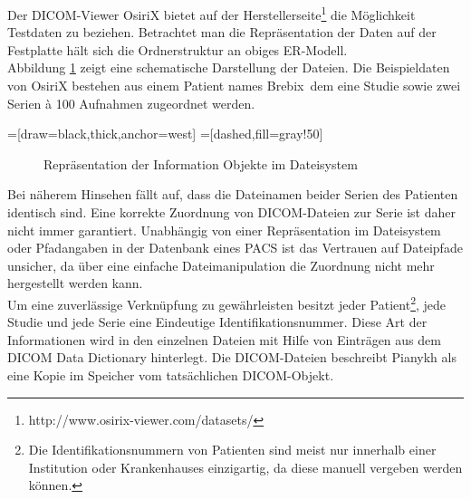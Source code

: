 Der DICOM-Viewer OsiriX bietet auf der Herstellerseite\footnote{http://www.osirix-viewer.com/datasets/} die Möglichkeit Testdaten zu beziehen. Betrachtet man die Repräsentation der Daten auf der Festplatte hält sich die Ordnerstruktur an obiges ER-Modell.\\
Abbildung \ref{filesystemrep} zeigt eine schematische Darstellung der Dateien. Die Beispieldaten von OsiriX bestehen aus einem Patient names \glqq Brebix\grqq\, dem eine Studie sowie zwei Serien à 100 Aufnahmen zugeordnet werden.

=[draw=black,thick,anchor=west]
=[dashed,fill=gray!50]
\begin{figure}[htbp]
\centering
\caption{Repräsentation der Information Objekte im Dateisystem}
\label{filesystemrep}
\end{figure}

Bei näherem Hinsehen fällt auf, dass die Dateinamen beider Serien des Patienten identisch sind. Eine korrekte Zuordnung von DICOM-Dateien zur Serie ist daher nicht immer garantiert. Unabhängig von einer Repräsentation im Dateisystem oder Pfadangaben in der Datenbank eines PACS ist das Vertrauen auf Dateipfade unsicher, da über eine einfache Dateimanipulation die Zuordnung nicht mehr hergestellt werden kann.\\
Um eine zuverlässige Verknüpfung zu gewährleisten besitzt jeder Patient\footnote{Die Identifikationsnummern von Patienten sind meist nur innerhalb einer Institution oder Krankenhauses einzigartig, da diese manuell vergeben werden können\cite[5.6.2]{pianykh:dicom}.}, jede Studie und jede Serie eine Eindeutige Identifikationsnummer. Diese Art der Informationen wird in den einzelnen Dateien mit Hilfe von Einträgen aus dem DICOM Data Dictionary\cite{dicom:dd} hinterlegt. Die DICOM-Dateien beschreibt Pianykh \cite[S. 47]{pianykh:dicom}
als eine Kopie im Speicher vom tatsächlichen DICOM-Objekt.


